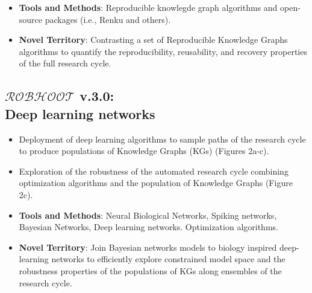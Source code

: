 \documentclass[12pt, a4paper]{article} %
\begin{document}
   \begin{itemize}
   \item {\bf Tools and Methods}: Reproducible knowlegde graph
     algorithms and open-source packages (i.e., Renku and others).
   \end{itemize}

    \begin{itemize}
    \item {\bf Novel Territory}: Contrasting a set of Reproducible
      Knowledge Graphs algorithms to quantify the reproducibility,
      reusability, and recovery properties of the full research cycle.
   \end{itemize}

  
  \subsection{{\bf $\mathcal{ROBHOOT}$ v.3.0}: \\ Deep learning networks}
  \begin{itemize}
  \item Deployment of deep learning algorithms to sample paths of the
    research cycle to produce populations of Knowledge Graphs (KGs)
    (Figures 2a-c).
  \item Exploration of the robustness of the automated research cycle
    combining optimization algorithms and the population of Knowledge
    Graphs (Figure 2c).
  \end{itemize}

 \begin{itemize}
 \item {\bf Tools and Methods}: Neural Biological Networks, Spiking
   networks, Bayesian Networks, Deep learning networks. Optimization
   algorithms.
 \end{itemize}

  \begin{itemize}
  \item {\bf Novel Territory}: Join Bayesian networks models to
    biology inspired deep-learning networks to efficiently explore
    constrained model space and the robustness properties of the
    populations of KGs along ensembles of the research cycle.
   \end{itemize}
  
  
\end{document}
